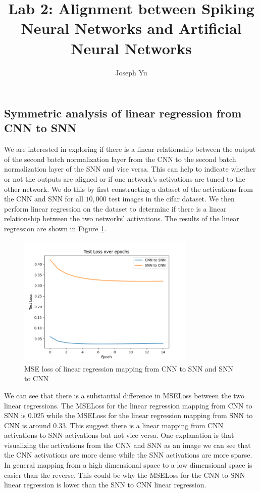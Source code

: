 \documentclass[12pt, letterpaper]{article}
\author{Joseph Yu}
\title{Lab 2: Alignment between Spiking Neural Networks and Artificial Neural Networks}
\begin{document}
\maketitle
\setcounter{section}{4}
\subsection{Symmetric analysis of linear regression from CNN to SNN}
We are interested in exploring if there is a linear relationship between the output of the second batch normalization layer from the CNN to the second batch normalization layer of the SNN and vice versa. This can help to indicate whether or not the outputs are aligned or if one network's activations are tuned to the other network. We do this by first constructing a dataset of the activations from the CNN and SNN for all $10,000$ test images in the cifar dataset. We then perform linear regression on the dataset to determine if there is a linear relationship between the two networks' activations. The results of the linear regression are shown in Figure \ref{fig:lin_reg_loss}.

\begin{figure}[H]
    \centering
    \includegraphics[width=0.75\textwidth]{lin_reg_loss.png}
    \caption{MSE loss of linear regression mapping from CNN to SNN and SNN to CNN}
    \label{fig:lin_reg_loss}
\end{figure}

We can see that there is a substantial difference in MSELoss between the two linear regressions. The MSELoss for the linear regression mapping from CNN to SNN is $0.025$ while the MSELoss for the linear regression mapping from SNN to CNN is around $0.33$. This suggest there is a linear mapping from CNN activations to SNN activations but not vice versa. One explanation is that visualizing the activations from the CNN and SNN as an image we can see that the CNN activations are more dense while the SNN activations are more sparse. In general mapping from a high dimensional space to a low dimensional space is easier than the reverse. This could be why the MSELoss for the CNN to SNN linear regression is lower than the SNN to CNN linear regression.
\end{document}
